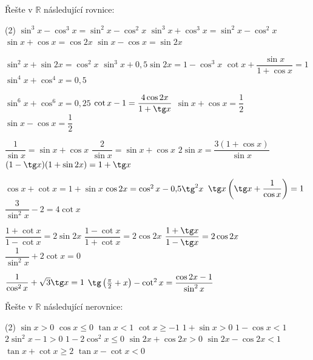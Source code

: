 \documentclass[12pt,a4paper]{article}
\begin{document}
\begin{exercise}
    Řešte v $\mathbb{R}$ následující rovnice:
    \begin{tasks}(2)
        \task $\sin^{3} x - \cos^{3} x = \sin^{2} x - \cos^{2} x$
        \task $\sin^{3} x + \cos^{3} x = \sin^{2} x - \cos^{2} x$
        \task $\sin x + \cos x = \cos 2x$
        \task $\sin x - \cos x = \sin 2x$

        \task $\sin^{2} x + \sin 2x = \cos^{2} x$
        \task $\sin^{3} x + 0{,}5 \sin 2x = 1 - \cos^{3} x$
        \task $\cot x + \dfrac{\sin x}{1 + \cos x} = 1$
        \task $\sin^{4} x + \cos^{4} x = 0{,}5$

        \task $\sin^{6} x + \cos^{6} x = 0{,}25$
        \task $\cot x - 1 = \dfrac{4 \cos 2x}{1 + \tg x}$
        \task $\sin x + \cos x = \dfrac{1}{2}$
        \task $\sin x - \cos x = \dfrac{1}{2}$

        \task $\dfrac{1}{\sin x} = \sin x + \cos x$
        \task $\dfrac{2}{\sin x} = \sin x + \cos x$
        \task $2 \sin x = \dfrac{3(1 + \cos x)}{\sin x}$
        \task $(1 - \tg x)(1 + \sin 2x) = 1 + \tg x$

        \task $\cos x + \cot x = 1 + \sin x$
        \task $\cos 2x = \cos^{2} x - 0{,}5 \tg^{2} x$
        \task $\tg x \left( \tg x + \dfrac{1}{\cos x} \right) = 1$
        \task $\dfrac{3}{\sin^{2} x} - 2 = 4 \cot x$

        \task $\dfrac{1 + \cot x}{1 - \cot x} = 2 \sin 2x$
        \task $\dfrac{1 - \cot x}{1 + \cot x} = 2 \cos 2x$
        \task $\dfrac{1 + \tg x}{1 - \tg x} = 2 \cos 2x$
        \task $\dfrac{1}{\sin^{2} x} + 2 \cot x = 0$

        \task $\dfrac{1}{\cos^{2} x} + \sqrt{3} \tg x = 1$
        \task $\tg \left(\frac{\pi}{2} + x\right) - \cot^{2} x
              = \dfrac{\cos 2x - 1}{\sin^{2} x}$
    \end{tasks}
\end{exercise}


\begin{exercise}
    Řešte v $\mathbb{R}$ následující nerovnice:
    \begin{tasks}(2)
        \task $\sin x > 0$
        \task $\cos x \le 0$
        \task $\tan x < 1$
        \task $\cot x \ge -1$
        \task $1 + \sin x > 0$
        \task $1 - \cos x < 1$
        \task $2 \sin^2 x - 1 > 0$
        \task $1 - 2 \cos^2 x \le 0$
        \task $\sin 2x + \cos 2x > 0$
        \task $\sin 2x - \cos 2x < 1$
        \task $\tan x + \cot x \ge 2$
        \task $\tan x - \cot x < 0$
    \end{tasks}
\end{exercise}
\end{document}
